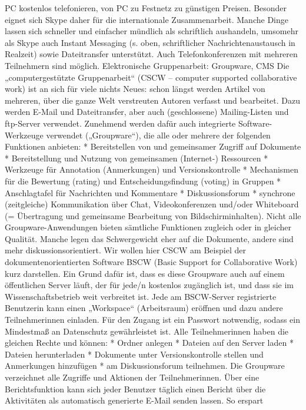 \documentclass[]{book}
\theoremstyle{definition}
\theoremstyle{definition}
\theoremstyle{definition}
\theoremstyle{remark}
\begin{document}
PC kostenlos telefonieren, von PC zu Festnetz zu günstigen Preisen.
Besonder eignet sich Skype daher für die internationale Zusammenarbeit.
Manche Dinge lassen sich schneller und einfacher mündlich als
schriftlich aushandeln, umsomehr als Skype auch Instant Messaging (s.
oben, schriftlicher Nachrichtenaustausch in Realzeit) sowie
Dateitransfer unterstützt. Auch Telefonkonferenzen mit mehreren
Teilnehmern sind möglich. Elektronische Gruppenarbeit: Groupware, CMS
Die „computergestützte Gruppenarbeit`` (CSCW -- computer supported
collaborative work) ist an sich für viele nichts Neues: schon längst
werden Artikel von mehreren, über die ganze Welt verstreuten Autoren
verfasst und bearbeitet. Dazu werden E-Mail und Dateitransfer, aber auch
(geschlossene) Mailing-Listen und ftp-Server verwendet. Zunehmend werden
dafür auch integrierte Software-Werkzeuge verwendet („Groupware``), die
alle oder mehrere der folgenden Funktionen anbieten: * Bereitstellen von
und gemeinsamer Zugriff auf Dokumente * Bereitstellung und Nutzung von
gemeinsamen (Internet-) Ressourcen * Werkzeuge für Annotation
(Anmerkungen) und Versionskontrolle * Mechanismen für die Bewertung
(rating) und Entscheidungsfindung (voting) in Gruppen * Anschlagtafel
für Nachrichten und Kommentare * Diskussionsforum * synchrone
(zeitgleiche) Kommunikation über Chat, Videokonferenzen und/oder
Whiteboard (= Übertragung und gemeinsame Bearbeitung von
Bildschirminhalten). Nicht alle Groupware-Anwendungen bieten sämtliche
Funktionen zugleich oder in gleicher Qualität. Manche legen das
Schwergewicht eher auf die Dokumente, andere sind mehr
diskussionsorientiert. Wir wollen hier CSCW am Beispiel der
dokumentenorientierten Software BSCW (Basic Support for Collaborative
Work) kurz darstellen. Ein Grund dafür ist, dass es diese Groupware auch
auf einem öffentlichen Server läuft, der für jede/n kostenlos zugänglich
ist, und dass sie im Wissenschaftsbetrieb weit verbreitet ist. Jede am
BSCW-Server registrierte Benutzerin kann einen „Workspace``
(Arbeitsraum) eröffnen und dazu andere Teilnehmerinnen einladen. Für den
Zugang ist ein Passwort notwendig, sodass ein Mindestmaß an Datenschutz
gewährleistet ist. Alle Teilnehmerinnen haben die gleichen Rechte und
können: * Ordner anlegen * Dateien auf den Server laden * Dateien
herunterladen * Dokumente unter Versionskontrolle stellen und
Anmerkungen hinzufügen * am Diskussionsforum teilnehmen. Die Groupware
verzeichnet alle Zugriffe und Aktionen der Teilnehmerinnen. Über eine
Berichtsfunktion kann sich jeder Benutzer täglich einen Bericht über die
Aktivitäten als automatisch generierte E-Mail senden lassen. So erspart
\end{document}

